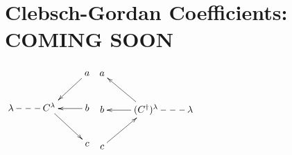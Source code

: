 \chapter{Clebsch-Gordan Coefficients: COMING SOON}
\label{ch-clebsch-gordan}


$\xymatrix{%
&& a \ar[dl]
\\
\lam 
&C^\lam\ar@{--}[l]\ar[dr]
&b\ar[l]
\\
&&c
}$
$\xymatrix{%
a
\\
b
& (C^\dagger )^\lam\ar[lu]\ar[l]
&\lam\ar@{--}[l]
\\
c\ar[ru]
}$








